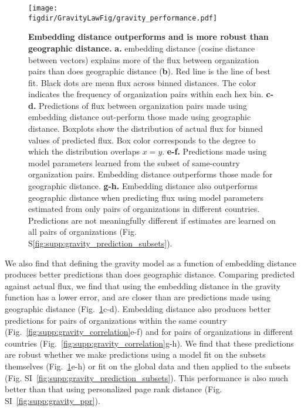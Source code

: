 \documentclass[12pt]{article} %
\def\figdir{../Figs}
\begin{document}
%
%
\begin{figure}[h!]
    \centering
    \label{fig:gravity_performance}
    \texttt{[image: \\figdir/GravityLawFig/gravity\_performance.pdf]}
    \caption{
        \textbf{Embedding distance outperforms and is more robust than geographic distance.}
        \textbf{a.} embedding distance (cosine distance between vectors) explains more of the flux between organization pairs than does geographic distance (\textbf{b}). 
        Red line is the line of best fit. 
        Black dots are mean flux across binned distances.
        The color indicates the frequency of organization pairs within each hex bin.
        \textbf{c-d.} Predictions of flux between organization pairs made using embedding distance out-perform those made using geographic distance. 
        Boxplots show the distribution of actual flux for binned values of predicted flux.
        Box color corresponds to the degree to which the distribution overlaps $x = y$.
        \textbf{e-f.} Predictions made using model parameters learned from the subset of same-country organization pairs. 
        Embedding distance outperforms those made for geographic distance.
        \textbf{g-h.} Embedding distance also outperforms geographic distance when predicting flux using model parameters estimated from only pairs of organizations in different countries. 
        Predictions are not meaningfully different if estimates are learned on all pairs of organizations (Fig. S\ref{fig:supp:gravity_prediction_subsets}).
    }
\end{figure}

We also find that defining the gravity model as a function of embedding distance produces better predictions than does geographic distance.
Comparing predicted against actual flux, we find that using the embedding distance in the gravity function has a lower error, and are closer than are predictions made using geographic distance (Fig.~\ref{fig:gravity_performance}c-d). 
Embedding distance also produces better predictions for pairs of organizations within the same country (Fig.~\ref{fig:supp:gravity_correlation}e-f) and for pairs of organizations in different countries (Fig.~\ref{fig:supp:gravity_correlation}g-h). 
We find that these predictions are robust whether we make predictions using a model fit on the subsets themselves (Fig.~\ref{fig:gravity_performance}e-h) or fit on the global data and then applied to the subsets (Fig. SI~\ref{fig:supp:gravity_prediction_subsets}). 
This performance is also much better than that using personalized page rank distance (Fig. SI~\ref{fig:supp:gravity_ppr}). 
\end{document}
